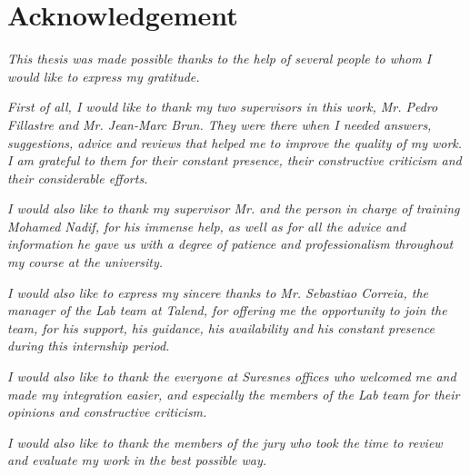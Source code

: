 \chapter*{Acknowledgement}
\thispagestyle{empty}


\vspace{0.75cm}
\textit{This thesis was made possible thanks to the help of several people to whom I would like to express my gratitude.}
\vspace{0.75cm}

\textit{ First of all, I would like to thank my two supervisors in this work, Mr. Pedro Fillastre and Mr. Jean-Marc Brun. They were there when I needed answers, suggestions, advice and reviews that helped me to improve the quality of my work. I am grateful to them for their constant presence, their constructive criticism and their considerable efforts.}

\vspace{0.75cm}

\textit{I would also like to thank my supervisor Mr. and the person in charge of training Mohamed Nadif, for his immense help, as well as for all the advice and information he gave us with a degree of patience and professionalism throughout my course at the university.}
\vspace{0.75cm}


\textit{I would also like to express my sincere thanks to Mr. Sebastiao Correia, the manager of the Lab team at Talend, for offering me the opportunity to join the team, for his support, his guidance, his availability and his constant presence during this internship period.}
\vspace{0.75cm}


\textit{I would also like to thank the everyone at Suresnes offices who welcomed me and made my integration easier, and especially the members of the Lab team for their opinions and constructive criticism.}
\vspace{0.75cm}


\textit{I would also like to thank the members of the jury who took the time to review and evaluate my work in the best possible way.}

